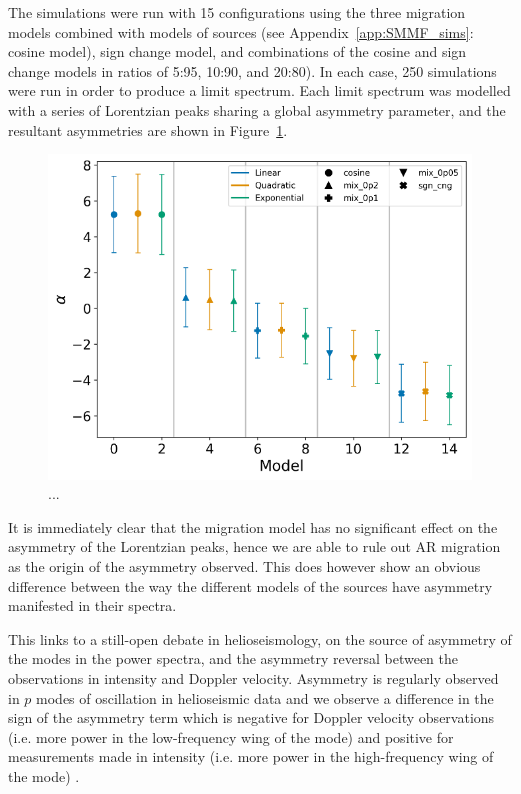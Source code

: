 The simulations were run with 15 configurations using the three migration models combined with models of sources (see Appendix~\ref{app:SMMF_sims}: cosine model), sign change model, and combinations of the cosine and sign change models in ratios of 5:95, 10:90, and 20:80). In each case, 250 simulations were run in order to produce a limit spectrum. Each limit spectrum was modelled with a series of Lorentzian peaks sharing a global asymmetry parameter, and the resultant asymmetries are shown in Figure~\ref{fig:artificial_asymm}.

\begin{figure}[ht!]
	\centering
	\includegraphics[width=0.85\columnwidth]{artificial_fit_asym_rescaled.png}
	\caption{...}
	\label{fig:artificial_asymm}
\end{figure}

It is immediately clear that the migration model has no significant effect on the asymmetry of the Lorentzian peaks, hence we are able to rule out AR migration as the origin of the asymmetry observed. This does however show an obvious difference between the way the different models of the sources have asymmetry manifested in their spectra.

This links to a still-open debate in helioseismology, on the source of asymmetry of the modes in the power spectra, and the asymmetry reversal between the observations in intensity and Doppler velocity. Asymmetry is regularly observed in $p$ modes of oscillation in helioseismic data and we observe a difference in the sign of the asymmetry term which is negative for Doppler velocity observations (i.e. more power in the low-frequency wing of the mode) and positive for measurements made in intensity (i.e. more power in the high-frequency wing of the mode) \citep{duvall_asymmetries_1993, chaplin_depth_1999, howe_validation_2015, basu_asteroseismic_2017}.

